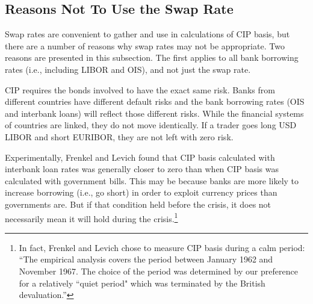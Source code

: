 \subsection{Reasons Not To Use the Swap Rate} \label{not_swap_section}


Swap rates are convenient to gather and use in calculations of CIP basis, but there are a number of reasons why swap rates may not be appropriate.  Two reasons are presented in this subsection.  The first applies to all bank borrowing rates (i.e., including LIBOR and OIS), and not just the swap rate.  


CIP requires the bonds involved to have the exact same risk.  Banks from different countries have different default risks and the bank borrowing rates (OIS and interbank loans) will reflect those different risks.  While the financial systems of countries are linked, they do not move identically.  If a trader goes long USD LIBOR and short EURIBOR, they are not left with zero risk. 


Experimentally, Frenkel and Levich\cite{Frenkel1975} found that CIP basis calculated with interbank loan rates was generally closer to zero than when CIP basis was calculated with government bills.  This may be because banks are more likely to increase borrowing (i.e., go short) in order to exploit currency prices than governments are.  But if that condition held before the crisis, it does not necessarily mean it will hold during the crisis.\footnote{In fact, Frenkel and Levich chose to measure CIP basis during a calm period: ``The empirical analysis covers the period between January 1962 and November 1967. The choice of the period was determined by our preference for a relatively ``quiet period" which was terminated by the British devaluation.''\cite{Frenkel1975}}


